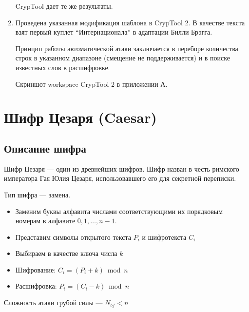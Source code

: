 \documentclass[a4paper, 14pt]{extarticle}
\begin{document}
\begin{enumerate}
    CrypTool дает те же результаты.

    \item Проведена указанная модификация шаблона в CrypTool 2. В качестве текста взят первый куплет ``Интернационала'' в адаптации Билли Брэгга. 

    Принцип работы автоматической атаки заключается в переборе количества строк в указанном диапазоне (смещение не поддерживается) и в поиске известных слов в расшифровке. 

    Скриншот workspace CrypTool 2 в приложении А.
    
\end{enumerate}
\section{Шифр Цезаря (Caesar)}
\subsection{Описание шифра}
Шифр Цезаря — один из древнейших шифров. Шифр назван в честь римского императора Гая Юлия Цезаря, использовавшего его для секретной переписки.

Тип шифра --- замена.

\begin{itemize}
    \item Заменим буквы алфавита числами соответствующими их порядковым номерам в алфавите $0, 1, \ldots, n-1$.
    \item Представим символы открытого текста $P_i$ и шифротекста $C_i$
    \item Выбираем в качестве ключа числа $k$
    \item Шифрование: $C_i = (P_i + k) \bmod n$ 
    \item Расшифровка: $ P_i = (C_i - k) \bmod n $\\
\end{itemize}

Сложность атаки грубой силы --- $N_{bf} < n$
\end{document}
